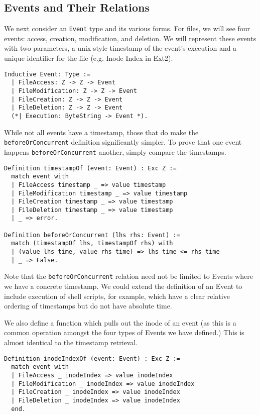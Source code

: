 \documentclass[nocopyrightspace]{sigplanconf}
\begin{document}
\subsection{Events and Their Relations}

We next consider an {\tt Event} type and its various forms. For files, we will
see four events: access, creation, modification, and deletion. We will
represent these events with two parameters, a unix-style timestamp of the
event's execution and a unique identifier for the file (e.g. Inode Index in
Ext2).

\begin{lstlisting}
Inductive Event: Type :=
  | FileAccess: Z -> Z -> Event
  | FileModification: Z -> Z -> Event
  | FileCreation: Z -> Z -> Event
  | FileDeletion: Z -> Z -> Event
  (*| Execution: ByteString -> Event *).
\end{lstlisting}

While not all events have a timestamp, those that do make the {\tt
beforeOrConcurrent} definition significantly simpler. To prove that one event
happens {\tt beforeOrConcurrent} another, simply compare the timestamps.

\begin{lstlisting}
Definition timestampOf (event: Event) : Exc Z :=
  match event with
  | FileAccess timestamp _ => value timestamp
  | FileModification timestamp _ => value timestamp
  | FileCreation timestamp _ => value timestamp
  | FileDeletion timestamp _ => value timestamp
  | _ => error.

Definition beforeOrConcurrent (lhs rhs: Event) :=
  match (timestampOf lhs, timestampOf rhs) with
  | (value lhs_time, value rhs_time) => lhs_time <= rhs_time
  | _ => False.
\end{lstlisting}

Note that the {\tt beforeOrConcurrent} relation need not be limited to Events
where we have a concrete timestamp. We could extend the definition of an Event
to include execution of shell scripts, for example, which have a clear
relative ordering of timestamps but do not have absolute time.

We also define a function which pulls out the inode of an event (as this is a
common operation amongst the four types of Events we have defined.) This is
almost identical to the timestamp retrieval. 

\begin{lstlisting}
Definition inodeIndexOf (event: Event) : Exc Z :=
  match event with
  | FileAccess _ inodeIndex => value inodeIndex
  | FileModification _ inodeIndex => value inodeIndex
  | FileCreation _ inodeIndex => value inodeIndex
  | FileDeletion _ inodeIndex => value inodeIndex
  end.
\end{lstlisting}
\end{document}
